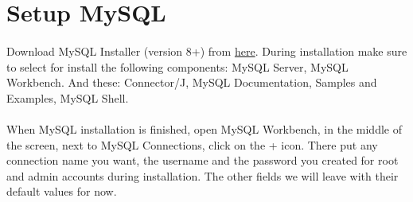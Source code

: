 
\section{Setup MySQL}
\paragraph{} Download MySQL Installer (version 8+) from \href{https://dev.mysql.com/downloads/installer/}{here}. During installation make sure to select for install the following components: MySQL Server, MySQL Workbench. And these: Connector/J, MySQL Documentation, Samples and Examples, MySQL Shell.
\paragraph{} When MySQL installation is finished, open MySQL Workbench, in the middle of the screen, next to MySQL Connections, click on the + icon. There put any connection name you want, the username and the password you created for root and admin accounts during installation. The other fields we will leave with their default values for now.
